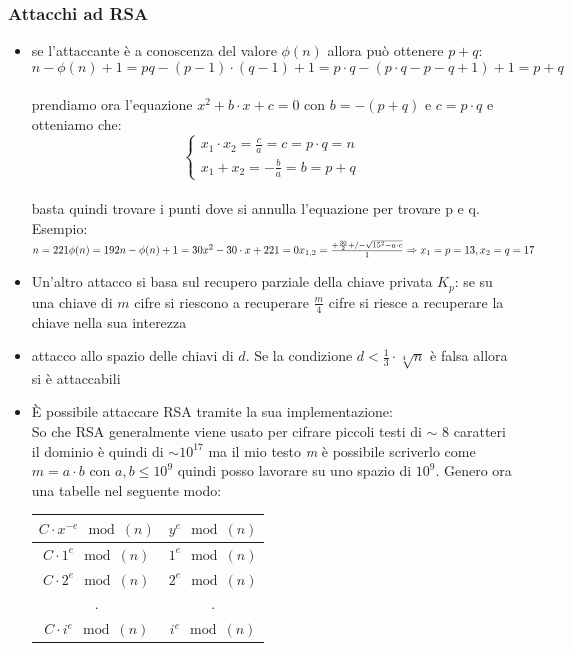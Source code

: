 \documentclass[10pt,a4paper]{article}
\begin{document}
\subsubsection{Attacchi ad RSA}
\begin{itemize}
\item se l'attaccante è a conoscenza del valore $\phi(n)$ allora può ottenere $p+q$:
$$n- \phi(n)+1 = pq-(p-1)\cdot(q-1)+1 = p\cdot q - (p\cdot q-p-q+1)+1 = p+q$$\\
prendiamo ora l'equazione $x^2+b\cdot x + c = 0$ con $b=-(p+q)$ e $c=p\cdot q$ e otteniamo che:\\
$$\begin{cases}
x_1\cdot x_2 = \frac{c}{a} = c = p\cdot q = n\\
x_1+x_2 = -\frac{b}{a} = b = p+q
\end{cases}$$\\
basta quindi trovare i punti dove si annulla l'equazione per trovare p e q.\\
Esempio:
$n=221 \phi(n)=192 \\ n-\phi(n)+1=30 \\ x^2-30\cdot x + 221 = 0 \\ x_{1,2}=\frac{+\frac{30}{2}+/- \sqrt{15^2-a \cdot c} }{1} \Rightarrow x_1=p=13,x_2=q=17$
\item Un'altro attacco si basa sul recupero parziale della chiave privata $K_p$: se su una chiave di $m$ cifre si riescono a recuperare $\frac{m}{4}$ cifre si riesce a recuperare la chiave nella sua interezza
\item attacco allo spazio delle chiavi di $d$. Se la condizione $d<\frac{1}{3}\cdot\sqrt[4]{n}$ è falsa allora si è attaccabili
\item È possibile attaccare RSA tramite la sua implementazione:\\
So che RSA generalmente viene usato per cifrare piccoli testi di $\sim$ 8 caratteri il dominio è quindi di $\sim 10^17$ ma il mio testo \textit{m} è possibile scriverlo come $m=a\cdot b$ con $a,b\le 10^9$ quindi posso lavorare su uno spazio di $10^9$. Genero ora una tabelle nel seguente modo:
\begin{center}
\begin{tabular}{c|c}
$C\cdot x^{-e} \mod(n)$& 	$y^e \mod(n)$ \\
\hline
$C\cdot 1^e \mod(n)$& 	$1^e \mod(n)$ \\
$C\cdot 2^e \mod(n)$& 	$2^e \mod(n)$ \\
.&.\\
$C\cdot i^e \mod(n)$& 	$i^e \mod(n)$  \\

\end{tabular}
\end{center}
\end{itemize}
\end{document}
